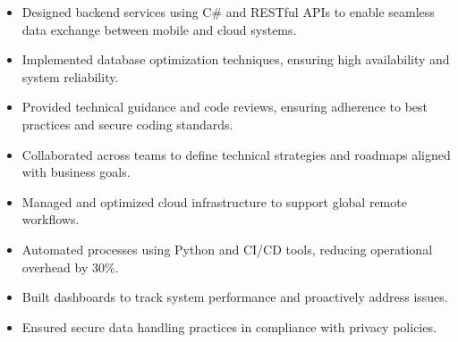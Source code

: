 \par\smallskip
\noindent
\begin{minipage}{20cm}
  \begin{minipage}{9.75cm}
    \begin{itemize}
      \item Designed backend services using C# and RESTful APIs to enable seamless data exchange between mobile and cloud systems.
      \item Implemented database optimization techniques, ensuring high availability and system reliability.
    \end{itemize}
  \end{minipage}
  \hfill
  \begin{minipage}{9.75cm}
    \begin{itemize}
      \item Provided technical guidance and code reviews, ensuring adherence to best practices and secure coding standards.
      \item Collaborated across teams to define technical strategies and roadmaps aligned with business goals.
    \end{itemize}
  \end{minipage}
\end{minipage}
\par\smallskip
\divider

\par\smallskip
\noindent
\begin{minipage}{20cm}
  \begin{minipage}{9.75cm}
    \begin{itemize}
      \item Managed and optimized cloud infrastructure to support global remote workflows.
      \item Automated processes using Python and CI/CD tools, reducing operational overhead by 30\%.
    \end{itemize}
  \end{minipage}
  \hfill
  \begin{minipage}{9.75cm}
    \begin{itemize}
      \item Built dashboards to track system performance and proactively address issues.
      \item Ensured secure data handling practices in compliance with privacy policies.
    \end{itemize}
  \end{minipage}
\end{minipage}

